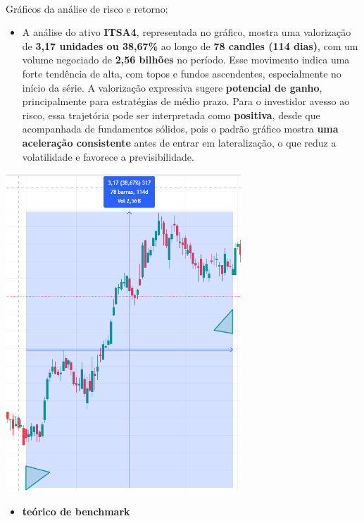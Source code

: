 \documentclass[
  letterpaper,
  DIV=11,
  numbers=noendperiod]{scrartcl}
\makeatletter
\let\oldparagraph\paragraph
\renewcommand{\paragraph}{
    \@ifstar
      \xxxParagraphStar
      \xxxParagraphNoStar
  }
\newcommand{\xxxParagraphStar}[1]{\oldparagraph*{#1}\mbox{}}
\newcommand{\xxxParagraphNoStar}[1]{\oldparagraph{#1}\mbox{}}
\providecommand{\tightlist}{%
  \setlength{\itemsep}{0pt}\setlength{\parskip}{0pt}}\usepackage{longtable,booktabs,array}
\makeatother
\begin{document}
\paragraph{Gráficos da análise de risco e
retorno:}\label{gruxe1ficos-da-anuxe1lise-de-risco-e-retorno}

\begin{itemize}
\tightlist
\item
  A análise do ativo \textbf{ITSA4}, representada no gráfico, mostra uma
  valorização de \textbf{3,17 unidades ou 38,67\%} ao longo de
  \textbf{78 candles (114 dias)}, com um volume negociado de
  \textbf{2,56 bilhões} no período. Esse movimento indica uma forte
  tendência de alta, com topos e fundos ascendentes, especialmente no
  início da série. A valorização expressiva sugere \textbf{potencial de
  ganho}, principalmente para estratégias de médio prazo. Para o
  investidor avesso ao risco, essa trajetória pode ser interpretada como
  \textbf{positiva}, desde que acompanhada de fundamentos sólidos, pois
  o padrão gráfico mostra \textbf{uma aceleração consistente} antes de
  entrar em lateralização, o que reduz a volatilidade e favorece a
  previsibilidade.
\end{itemize}

\includegraphics[width=3.47917in,height=\textheight,keepaspectratio]{images/BHA_ITSA4-01.PNG}

\begin{itemize}
\tightlist
\item
  \textbf{teórico de benchmark}
\end{itemize}
\end{document}
